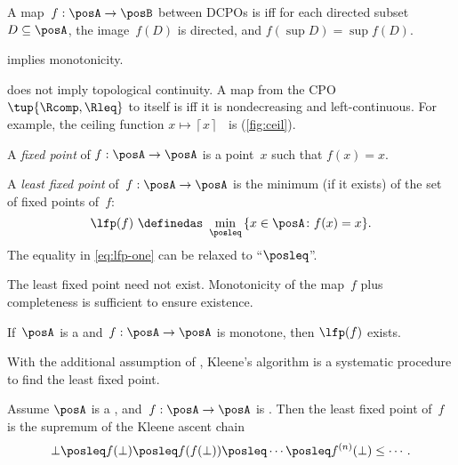 \begin{definition}[\scottcontinuity]
  \label{def:scott}A map~$f:\posA\rightarrow\posB$ between DCPOs
  is\textbf{ }\emph{\scottcontinuous{}}\textbf{ }iff for each directed
  subset~$D\subseteq\posA$, the image~$f(D)$ is directed, and $f(\sup D)=\sup f(D).$
\end{definition}
\begin{remark}
  \scottcontinuity implies monotonicity.
\end{remark}

\begin{remark}
  \scottcontinuity does not imply topological continuity. A map from
  the CPO $\tup{\Rcomp,\Rleq}$ to itself is \scottcontinuous
  iff it is nondecreasing and left-continuous. For example, the ceiling
  function $x\mapsto\left\lceil x\right\rceil $~ is \scottcontinuous
  (\cref{fig:ceil}).
\end{remark}

\emph{}

A \emph{fixed point} of $f:\posA\to\posA$ is a point~$x$
such that $f(x)=x$.
\begin{definition}
  A \emph{least fixed point} of~$f:\posA\to\posA$ is the minimum
  (if it exists) of the set of fixed points of~$f$:
  \begin{equation}
    \lfp(f)\,\,\definedas\,\,\min_{\posleq}\,\{x\in\posA\colon f(x)=x\}.\label{eq:lfp-one}
  \end{equation}
  The equality in \cref{eq:lfp-one} can be relaxed to ``$\posleq$''.
\end{definition}
The least fixed point need not exist. Monotonicity of the map~$f$
plus completeness is sufficient to ensure existence.
\begin{lemma}
  \label{lem:CPO-fix-point-2}If~$\posA$ is a \CPO and~$f:\posA\rightarrow\posA$
  is monotone, then $\lfp(f)$ exists.
\end{lemma}


With the additional assumption of \scottcontinuity, Kleene's algorithm
is a systematic procedure to find the least fixed point.
\begin{lemma}
  \label{lem:kleene-1}Assume $\posA$ is a \CPO, and~$f:\posA\rightarrow\posA$
  is \scottcontinuous. Then the least fixed point of~$f$ is the supremum
  of the Kleene ascent chain
  \[
    \bot\posleq f(\bot)\posleq f(f(\bot))\posleq\cdots\posleq f^{(n)}(\bot)\leq\cdots.
  \]
\end{lemma}
